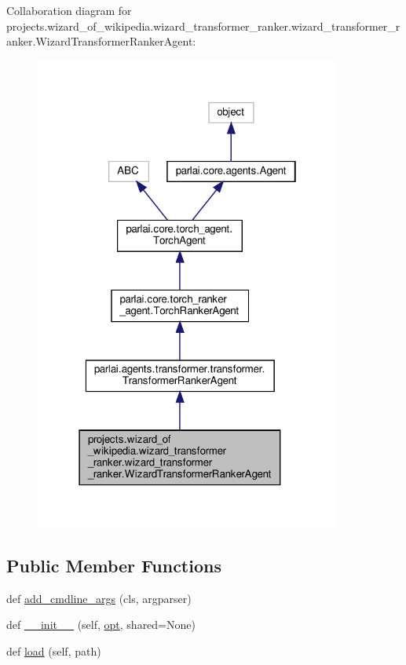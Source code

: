 Collaboration diagram for projects.\+wizard\+\_\+of\+\_\+wikipedia.\+wizard\+\_\+transformer\+\_\+ranker.\+wizard\+\_\+transformer\+\_\+ranker.\+Wizard\+Transformer\+Ranker\+Agent\+:
\nopagebreak
\begin{figure}[H]
\begin{center}
\leavevmode
\includegraphics[width=286pt]{d6/d32/classprojects_1_1wizard__of__wikipedia_1_1wizard__transformer__ranker_1_1wizard__transformer__ra5ca474d676e0832cca4857ef332d07fd}
\end{center}
\end{figure}
\subsection*{Public Member Functions}
\begin{DoxyCompactItemize}
\item 
def \hyperlink{classprojects_1_1wizard__of__wikipedia_1_1wizard__transformer__ranker_1_1wizard__transformer__rad02f16524e5e0423aa3e2c69e1330ee1_a8dea037d2903975503586b5aa5c8bd36}{add\+\_\+cmdline\+\_\+args} (cls, argparser)
\item 
def \hyperlink{classprojects_1_1wizard__of__wikipedia_1_1wizard__transformer__ranker_1_1wizard__transformer__rad02f16524e5e0423aa3e2c69e1330ee1_ab5d22f936f8fb1a53569b750e8947edd}{\+\_\+\+\_\+init\+\_\+\+\_\+} (self, \hyperlink{classparlai_1_1core_1_1torch__agent_1_1TorchAgent_a785bb920cf8c8afc3e9bf6a8b77e335a}{opt}, shared=None)
\item 
def \hyperlink{classprojects_1_1wizard__of__wikipedia_1_1wizard__transformer__ranker_1_1wizard__transformer__rad02f16524e5e0423aa3e2c69e1330ee1_abc21f0fa56df7a5cd42a011b66eed02b}{load} (self, path)
\end{DoxyCompactItemize}
